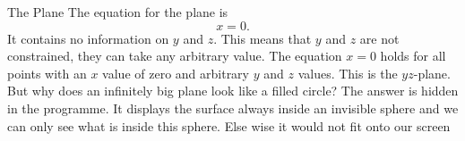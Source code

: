 \begin{surferPage}[Plane]{The Plane}
The equation for the plane is \[x=0.\] It contains no information on $y$ and $z$. This means that $y$ and $z$ are not constrained, they can take any arbitrary value.
The equation $x=0$ holds for all points with an $x$ value of zero and arbitrary $y$ and $z$ values. This is the $yz$-plane.
\newline \newline
But why does an infinitely big plane look like a filled circle? The answer is hidden in the programme. It displays the surface always inside an invisible sphere and we can only see what is inside this sphere. Else wise it would not fit onto our screen
\end{surferPage}
